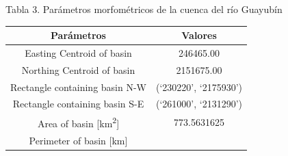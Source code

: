 \documentclass[11pt,]{article}
\begin{document}
Tabla 3. Parámetros morfométricos de la cuenca del río Guayubín

\begin{longtable}[]{@{}cc@{}}
\toprule
\begin{minipage}[b]{0.65\columnwidth}\centering\strut
Parámetros\strut
\end{minipage} & \begin{minipage}[b]{0.29\columnwidth}\centering\strut
Valores\strut
\end{minipage}\tabularnewline
\midrule
\endhead
\begin{minipage}[t]{0.65\columnwidth}\centering\strut
Easting Centroid of basin\strut
\end{minipage} & \begin{minipage}[t]{0.29\columnwidth}\centering\strut
246465.00\strut
\end{minipage}\tabularnewline
\begin{minipage}[t]{0.65\columnwidth}\centering\strut
Northing Centroid of basin\strut
\end{minipage} & \begin{minipage}[t]{0.29\columnwidth}\centering\strut
2151675.00\strut
\end{minipage}\tabularnewline
\begin{minipage}[t]{0.65\columnwidth}\centering\strut
Rectangle containing basin N-W\strut
\end{minipage} & \begin{minipage}[t]{0.29\columnwidth}\centering\strut
(`230220', `2175930')\strut
\end{minipage}\tabularnewline
\begin{minipage}[t]{0.65\columnwidth}\centering\strut
Rectangle containing basin S-E\strut
\end{minipage} & \begin{minipage}[t]{0.29\columnwidth}\centering\strut
(`261000', `2131290')\strut
\end{minipage}\tabularnewline
\begin{minipage}[t]{0.65\columnwidth}\centering\strut
Area of basin {[}km\textsuperscript{2}{]}\strut
\end{minipage} & \begin{minipage}[t]{0.29\columnwidth}\centering\strut
773.5631625\strut
\end{minipage}\tabularnewline
\begin{minipage}[t]{0.65\columnwidth}\centering\strut
Perimeter of basin {[}km{]}\strut
\end{minipage} & \begin{minipage}[t]{0.29\columnwidth}\centering\strut

\end{minipage}
\end{longtable}
\end{document}
